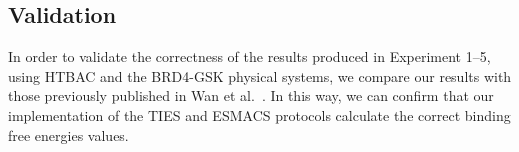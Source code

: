 


\subsection{Validation}

In order to validate the correctness of the results produced in Experiment
1--5, using HTBAC and the BRD4-GSK physical systems, we compare our results
with those previously published in Wan et al.~\cite{Wan2017brd4}. In this
way, we can confirm that our implementation of the TIES and ESMACS protocols
calculate the correct binding free energies values.

